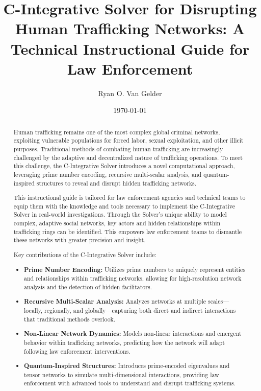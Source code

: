 \documentclass[%
 preprint, linenumbers,
 amsmath,amssymb,
 aps, physrev,
]{revtex4-2}
\begin{document}

\title{C-Integrative Solver for Disrupting Human Trafficking Networks: A Technical Instructional Guide for Law Enforcement}
\author{Ryan O. Van Gelder}

\date{\today}

\begin{abstract}
Human trafficking remains one of the most complex global criminal networks, exploiting vulnerable populations for forced labor, sexual exploitation, and other illicit purposes. Traditional methods of combating human trafficking are increasingly challenged by the adaptive and decentralized nature of trafficking operations. To meet this challenge, the C-Integrative Solver introduces a novel computational approach, leveraging prime number encoding, recursive multi-scalar analysis, and quantum-inspired structures to reveal and disrupt hidden trafficking networks.

This instructional guide is tailored for law enforcement agencies and technical teams to equip them with the knowledge and tools necessary to implement the C-Integrative Solver in real-world investigations. Through the Solver’s unique ability to model complex, adaptive social networks, key actors and hidden relationships within trafficking rings can be identified. This empowers law enforcement teams to dismantle these networks with greater precision and insight.

Key contributions of the C-Integrative Solver include:
\begin{itemize}
    \item \textbf{Prime Number Encoding:} Utilizes prime numbers to uniquely represent entities and relationships within trafficking networks, allowing for high-resolution network analysis and the detection of hidden facilitators.
    \item \textbf{Recursive Multi-Scalar Analysis:} Analyzes networks at multiple scales—locally, regionally, and globally—capturing both direct and indirect interactions that traditional methods overlook.
    \item \textbf{Non-Linear Network Dynamics:} Models non-linear interactions and emergent behavior within trafficking networks, predicting how the network will adapt following law enforcement interventions.
    \item \textbf{Quantum-Inspired Structures:} Introduces prime-encoded eigenvalues and tensor networks to simulate multi-dimensional interactions, providing law enforcement with advanced tools to understand and disrupt trafficking systems.
\end{itemize}
\end{abstract}
\maketitle
\tableofcontents
\end{document}
